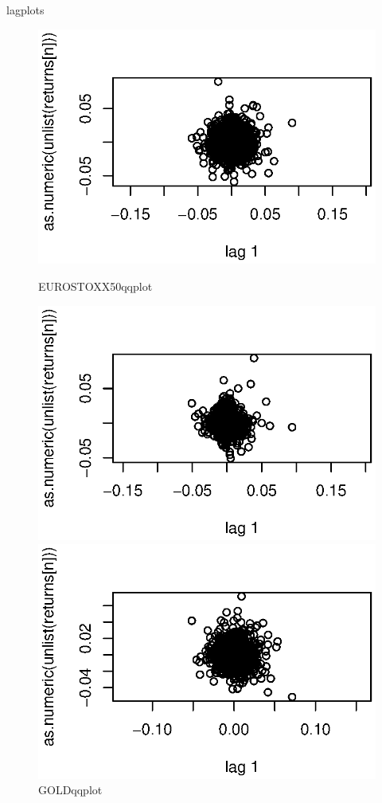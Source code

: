 \documentclass{beamer}
\begin{document}
\begin{frame}{lagplots}
	\begin{figure}[h] \label{}
		\begin{minipage}[b]{0.40\linewidth}
			\centering
			\includegraphics[width=1\linewidth]{EUROSTOXX50lagplot.eps}
			\caption{EUROSTOXX50qqplot}
		\end{minipage} \begin{minipage}[b]{0.40\linewidth}
			\centering
			\includegraphics[width=1\linewidth]{GOLDlagplot.eps}
			\caption{GOLDqqplot}
		\end{minipage} \begin{minipage}[b]{0.40\linewidth}
			\centering
			\includegraphics[width=1\linewidth]{NASDAQlagplot.eps}

\end{minipage}
\end{figure}
\end{frame}
\end{document}
